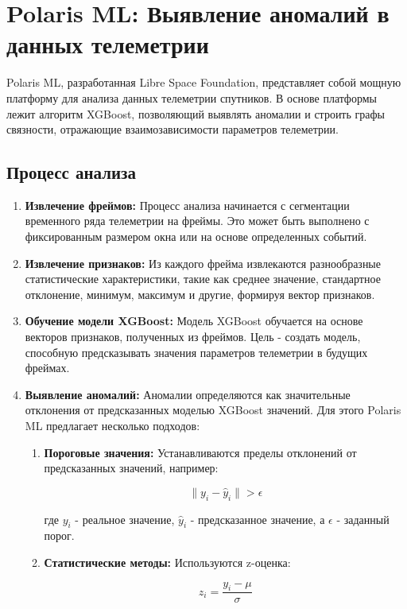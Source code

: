 \documentclass[12pt, a4paper]{extreport}
\begin{document}
\section{Polaris ML: Выявление аномалий в данных телеметрии}

Polaris ML, разработанная Libre Space Foundation, представляет собой мощную платформу для анализа данных телеметрии спутников. В основе платформы лежит алгоритм XGBoost, позволяющий выявлять аномалии и строить графы связности, отражающие взаимозависимости параметров телеметрии.

\subsection{Процесс анализа}

\begin{enumerate}[label=\arabic*.]
    \item \textbf{Извлечение фреймов:} Процесс анализа начинается с сегментации временного ряда телеметрии на фреймы. Это может быть выполнено с фиксированным размером окна или на основе определенных событий.
    \item \textbf{Извлечение признаков:} Из каждого фрейма извлекаются разнообразные статистические характеристики, такие как среднее значение, стандартное отклонение, минимум, максимум и другие, формируя вектор признаков.
    \item \textbf{Обучение модели XGBoost:} Модель XGBoost обучается на основе векторов признаков, полученных из фреймов. Цель - создать модель, способную предсказывать значения параметров телеметрии в будущих фреймах.
    \item \textbf{Выявление аномалий:} Аномалии определяются как значительные отклонения от предсказанных моделью XGBoost значений. Для этого Polaris ML предлагает несколько подходов:
          \begin{enumerate}[label=\alph*.]
              \item \textbf{Пороговые значения:} Устанавливаются пределы отклонений от предсказанных значений, например:

                    $$\| y_i - \hat{y}_i \| > \epsilon$$

                    где $y_i$ - реальное значение, $\hat{y}_i$ - предсказанное значение, а $\epsilon$ - заданный порог.
              \item \textbf{Статистические методы:} Используются z-оценка:

                    $$z_i = \frac{y_i - \mu}{\sigma}$$


\end{enumerate}
\end{enumerate}
\end{document}
